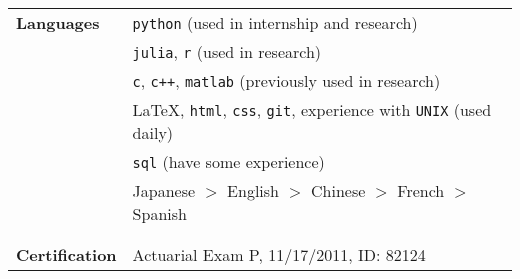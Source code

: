 \documentclass[utf8,letterpaper,oneside]{article}
\begin{document}
\begin{center}
\begin{tabular}{l l}
  \textbf{Languages}     & \texttt{python} (used in internship and research)                                                     \\
                         & \texttt{julia}, \texttt{r} (used in research)                                                         \\
                         & \texttt{c}, \texttt{c++}, \texttt{matlab} (previously used in research)                               \\
                         & \LaTeX, \texttt{html}, \texttt{css}, \texttt{git}, experience with \texttt{UNIX} (used daily)         \\
                         & \texttt{sql} (have some experience)                                                                   \\
                         & Japanese $>$ English $>$ Chinese $>$ French $>$ Spanish                                               \\
                         &                                                                                                       \\\hline
                         &                                                                                                       \\
  \textbf{Certification} & Actuarial Exam P, 11/17/2011, ID: 82124                                                               \\

\end{tabular}
\end{center}
\end{document}
